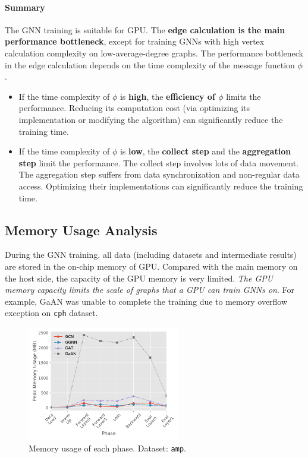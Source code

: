 \paragraph{Summary}
The GNN training is suitable for GPU.
The \textbf{edge calculation is the main performance bottleneck}, except for training GNNs with high vertex calculation complexity on low-average-degree graphs.
The performance bottleneck in the edge calculation depends on the time complexity of the message function $\phi$.
\begin{itemize}
    \item If the time complexity of $\phi$ is \textbf{high}, the \textbf{efficiency of $\phi$} limits the performance. Reducing its computation cost (via optimizing its implementation or modifying the algorithm) can significantly reduce the training time.
    \item If the time complexity of $\phi$ is \textbf{low}, the \textbf{collect step} and the \textbf{aggregation step} limit the performance. The collect step involves lots of data movement. The aggregation step suffers from data synchronization and non-regular data access. Optimizing their implementations can significantly reduce the training time.
\end{itemize}

\subsection{Memory Usage Analysis}
\label{sec:memory_usage_analysis}

During the GNN training, all data (including datasets and intermediate results) are stored in the on-chip memory of GPU.
Compared with the main memory on the host side, the capacity of the GPU memory is very limited.
\emph{The GPU memory capacity limits the scale of graphs that a GPU can train GNNs on}.
For example, GaAN was unable to complete the training due to memory overflow exception on \texttt{cph} dataset.

\begin{figure}
    \centering
    \includegraphics[height=5cm]{figs/experiments/exp_memory_usage_stage_amp.pdf}
    \caption{Memory usage of each phase. Dataset: \texttt{amp}.}
    \label{fig:exp_memory_usage_stage_amp}
\end{figure}

